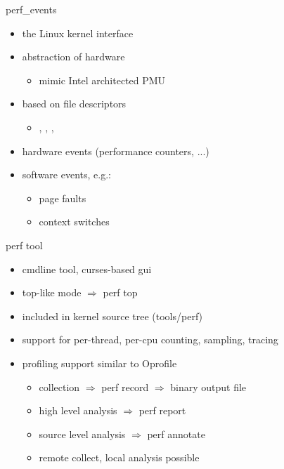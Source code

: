 \begin{frame}{perf\_events}
\begin{itemize}
  \item the Linux kernel interface
  \item abstraction of hardware
  \begin{itemize}
    \item mimic Intel architected PMU
  \end{itemize}
  \item based on file descriptors
  \begin{itemize}
    \item {}, , , 
  \end{itemize}
  \item hardware events (performance counters, ...)
  \item software events, e.g.:
  \begin{itemize}
    \item page faults
    \item context switches
  \end{itemize}
\end{itemize}
\end{frame}

\begin{frame}{perf tool}
\begin{itemize}
  \item cmdline tool, curses-based gui
  \item top-like mode $\Rightarrow$ perf top
  \item included in kernel source tree (tools/perf)
  \item support for per-thread, per-cpu counting, sampling, tracing
  \item profiling support similar to Oprofile
  \begin{itemize}
    \item collection $\Rightarrow$ perf record $\Rightarrow$ binary output file
    \item high level analysis $\Rightarrow$ perf report
    \item source level analysis $\Rightarrow$ perf annotate
    \item remote collect, local analysis possible
  \end{itemize}
\end{itemize}
\end{frame}


